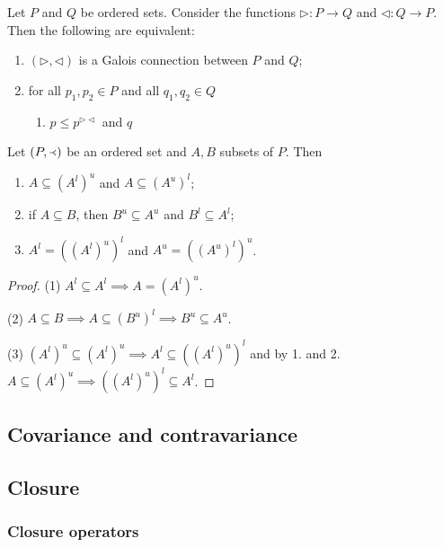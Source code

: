 \begin{proposition}
Let $P$ and $Q$ be ordered sets. Consider the functions $\triangleright: P\to Q$ and $\triangleleft: Q \to P$. Then the following are equivalent:
\begin{enumerate}
\item $(\triangleright, \triangleleft)$ is a Galois connection between $P$ and $Q$;
\item for all $p_1,p_2\in P$ and all $q_1,q_2\in Q$
\begin{enumerate}
\item $p \leq p^{\triangleright\triangleleft}$ and $q$
\end{enumerate}
\end{enumerate}
\end{proposition}

\begin{corollary}
Let $(P,\Yleft)$ be an ordered set and $A,B$ subsets of $P$. Then
\begin{enumerate}
\item $A\subseteq (A^l)^u$ and $A\subseteq (A^u)^l$;
\item if $A\subseteq B$, then $B^u\subseteq A^u$ and $B^l \subseteq A^l$;
\item $A^l = ((A^l)^u)^l$ and $A^u = ((A^u)^l)^u$.
\end{enumerate}
\end{corollary}
\begin{proof}
(1) $A^l \subseteq A^l \implies A = (A^l)^u$.

(2) $A\subseteq B \implies A \subseteq (B^u)^l \implies B^u\subseteq A^u$.

(3) $(A^l)^u \subseteq (A^l)^u \implies A^l \subseteq ((A^l)^u)^l$ and by 1. and 2. $A\subseteq (A^l)^u \implies ((A^l)^u)^l \subseteq A^l$.
\end{proof}

\subsection{Covariance and contravariance}


\subsection{Closure}

\subsubsection{Closure operators}

